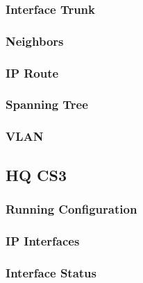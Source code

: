 \subsubsection{Interface Trunk}


\subsubsection{Neighbors}


\subsubsection{IP Route}


\subsubsection{Spanning Tree}


\subsubsection{VLAN}






\subsection{HQ CS3}
\subsubsection{Running Configuration}


\subsubsection{IP Interfaces}


\subsubsection{Interface Status}


